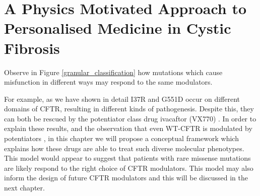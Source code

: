 \section{A Physics Motivated Approach to Personalised Medicine in Cystic Fibrosis}
Observe in Figure \ref{granular_classification} how mutations which cause misfunction in different ways may respond to the same modulators. 

For example, as we have shown in detail I37R and G551D occur on different domains of CFTR, resulting in different kinds of pathogenesis. Despite this, they can both be rescued by the potentiator class drug ivacaftor (VX770) \cite{vangoor2014,wong2022}. In order to explain these results, and the observation that even WT-CFTR is modulated by potentiators \cite{csanady2019}, in this chapter we will propose a conceptual framework which explains how these drugs are able to treat such diverse molecular phenotypes. This model would appear to suggest that patients with rare missense mutations are likely respond to the right choice of CFTR modulators. This model may also inform the design of future CFTR modulators and this will be discussed in the next chapter. 

